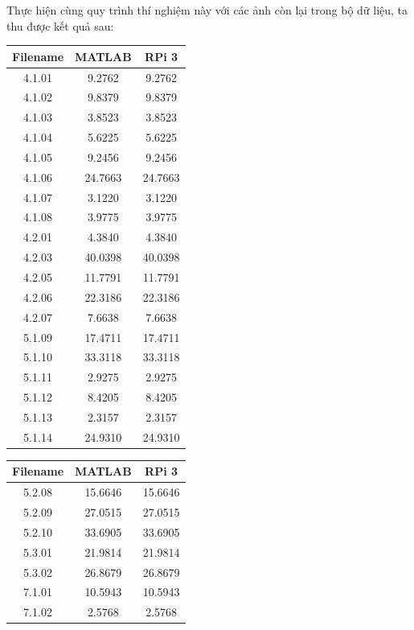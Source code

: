 Thực hiện cùng quy trình thí nghiệm này với các ảnh còn lại trong bộ dữ liệu, ta thu được kết quả sau:

\begin{table}[H]
\centering
\begin{tabular}{|c|c|c|}
\hline
\textbf{Filename} & \textbf{MATLAB} & \textbf{RPi 3} \\ \hline
4.1.01 & 9.2762 & 9.2762 \\ \hline
4.1.02 & 9.8379 & 9.8379 \\ \hline
4.1.03 & 3.8523 & 3.8523 \\ \hline
4.1.04 & 5.6225 & 5.6225 \\ \hline
4.1.05 & 9.2456 & 9.2456 \\ \hline
4.1.06 & 24.7663 & 24.7663 \\ \hline
4.1.07 & 3.1220 & 3.1220 \\ \hline
4.1.08 & 3.9775 & 3.9775 \\ \hline
4.2.01 & 4.3840 & 4.3840 \\ \hline
4.2.03 & 40.0398 & 40.0398 \\ \hline
4.2.05 & 11.7791 & 11.7791 \\ \hline
4.2.06 & 22.3186 & 22.3186 \\ \hline
4.2.07 & 7.6638 & 7.6638 \\ \hline
5.1.09 & 17.4711 & 17.4711 \\ \hline
5.1.10 & 33.3118 & 33.3118 \\ \hline
5.1.11 & 2.9275 & 2.9275 \\ \hline
5.1.12 & 8.4205 & 8.4205 \\ \hline
5.1.13 & 2.3157 & 2.3157 \\ \hline
5.1.14 & 24.9310 & 24.9310 \\ \hline
\end{tabular}
\hspace{2em}
\begin{tabular}{|c|c|c|}
\hline
\textbf{Filename} & \textbf{MATLAB} & \textbf{RPi 3} \\ \hline
5.2.08 & 15.6646 & 15.6646 \\ \hline
5.2.09 & 27.0515 & 27.0515 \\ \hline
5.2.10 & 33.6905 & 33.6905 \\ \hline
5.3.01 & 21.9814 & 21.9814 \\ \hline
5.3.02 & 26.8679 & 26.8679 \\ \hline
7.1.01 & 10.5943 & 10.5943 \\ \hline
7.1.02 & 2.5768 & 2.5768 \\ \hline

\end{tabular}
\end{table}
